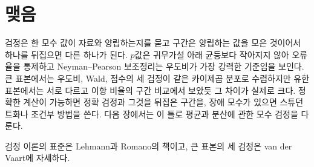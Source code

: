 \section{맺음}

검정은 한 모수 값이 자료와 양립하는지를 묻고 구간은 양립하는 값을 모은 것이어서 하나를 뒤집으면 다른 하나가 된다. $p$값은 귀무가설 아래 균등보다 작아지지 않아 오류율을 통제하고 Neyman--Pearson 보조정리는 우도비가 가장 강력한 기준임을 보인다. 큰 표본에서는 우도비, Wald, 점수의 세 검정이 같은 카이제곱 분포로 수렴하지만 유한 표본에서는 서로 다르고 이항 비율의 구간 비교에서 보았듯 그 차이가 실제로 크다. 정확한 계산이 가능하면 정확 검정과 그것을 뒤집은 구간을, 장애 모수가 있으면 스튜던트화나 조건부 방법을 쓴다. 다음 장에서는 이 틀로 평균과 분산에 관한 모수 검정을 다룬다.

검정 이론의 표준은 Lehmann과 Romano의 책\cite{lehmann2005}이고, 큰 표본의 세 검정은 van der Vaart\cite{vandervaart1998}에 자세하다.

\chapterreferences
